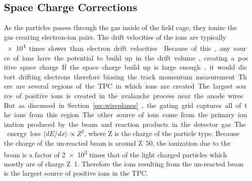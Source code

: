 
\subsection{Space Charge Corrections}
\label{sec:spacecharge}


As the particles passes through the gas inside of the field cage, they ionize the gas creating electron-ion pairs. The drift velocities of the ions are typically \SI{e4} times slower than electron drift velocities \cite{blumrol}. Because of this, any source of ions have the potential to build up in the drift volume, creating a positive space charge. If the space charge build up is large enough, it would distort drifting electrons therefore biasing the track momentum measurement. There are several regions of the TPC in which ions are created. The largest source of positive ions is created in the avalanche process near the anode wires. But as discussed in Section~\ref{sec:wireplanes}, the gating grid captures all of the ions from this region. The other source of ions come from the primary ionization produced by the beam and reaction products in the detector gas. The energy loss  $\langle dE/dx\rangle \propto Z^2$, where Z is the charge of the particle type. Because the charge of the un-reacted beam is around Z~50, the ionization due to the beam is a factor of \num{2e3} times that of the light charged particles which mostly are of charge Z~1. Therefore the ions resulting from the un-reacted beam is the largest source of positive ions in the TPC. 


 
 \begin{comment}
 
 \begin{table}[!htb] %
\centering %
\begin{tabular}{
  @{}
  l
  S[table-format=1.2]
  S[table-format=1.2]
  S[table-format=1.2]
  S[table-format=5.2]
  S[table-format=5.2]
  @{}
}
\toprule
Beam Energy Loss  &
 {${}^{132}$Sn} &
 {${}^{124}$Sn} &
 {${}^{112}$Sn} &
 {${}^{108}$Sn} &
  {Avg.}\\
  
\midrule
$\si{\kilo\eV\per\centi\meter}$ & 11.2   &.034  &5.43   &  903   &150     \\
\bottomrule
\end{tabular}

\caption{Average energy loss of each beam.}
\label{tb:beameloss}
\end{table}
\end{comment}


